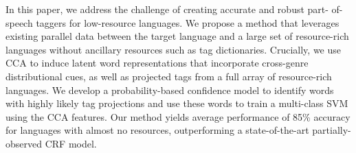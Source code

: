 In this paper, we address the challenge of creating accurate and robust part- of- speech taggers for low-resource languages. We propose a method that leverages existing parallel data between the target language and a large set of resource-rich languages without ancillary resources such as tag dictionaries. Crucially, we use CCA to induce latent word representations that incorporate cross-genre distributional cues, as well as projected tags from a full array of resource-rich languages. We develop a probability-based confidence model to identify words with highly likely tag projections and use these words to train a multi-class SVM using the CCA features.  Our method yields average performance of 85\% accuracy for languages with almost no resources, outperforming a state-of-the-art partially-observed CRF model.
